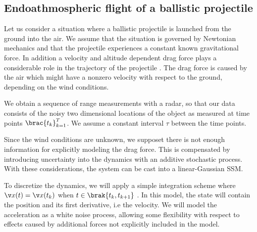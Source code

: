 
\subsection{Endoathmospheric flight of a ballistic projectile}\label{sec:ballistic}
Let us consider a situation where a ballistic projectile is launched
from the ground into the air. We assume that the situation is governed by Newtonian
mechanics and that the projectile experiences a constant known gravitational
force. In addition a velocity and altitude dependent drag force plays
a considerable role in the trajectory of the projectile \parencite{ristic2004beyond}. 
The drag force is caused by the air which might have a nonzero velocity with respect to the ground,
depending on the wind conditions.
 
We obtain a sequence of range measurements with a radar,
so that our data consists of the noisy two dimensional locations 
of the object as measured at time points $\brac{t_k}_{k=1}^T$.
We assume a constant interval $\tau$ between the time points.

Since the wind conditions are unknown, we supposet there is not
enough information for explicitly modeling the drag force. 
This is compensated by introducing
uncertainty into the dynamics with an additive stochastic process.
With these considerations, the system can be cast into a linear-Gaussian
SSM. 


To discretize the dynamics, we will apply a simple integration scheme where 
$\x(t)=\x(t_k)$ when $t\in\brak{t_k,t_{k+1}}$ \parencite{bar2004estimation}.
In this model, the state will contain the position and
its first derivative, i.e the velocity. We will model the acceleration as a white noise
process, allowing some flexibility with respect to effects caused by additional forces not explicitly
included in the model.

